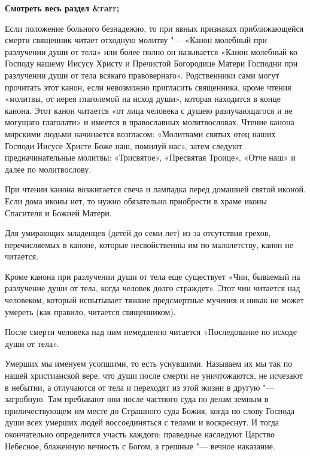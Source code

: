 




\bfseries Смотреть весь раздел &rarr;\normalfont{} 




Если положение больного безнадежно, то при явных признаках приближающейся смерти священник читает отходную молитву "--- «Канон молебный при разлучении души от тела» или более полно он называется «Канон молебный ко Господу нашему Иисусу Христу и Пречистой Богородице Матери Господни при разлучении души от тела всякаго правовернаго». Родственники сами могут прочитать этот канон, если невозможно пригласить священника, кроме чтения «молитвы, от иерея глаголемой на исход души», которая находится в конце канона. Этот канон читается «от лица человека с душею разлучающагося и не могущаго глаголати» и имеется в православных молитвословах. Чтение канона мирскими людьми начинается возгласом: «Молитвами святых отец наших Господи Иисусе Христе Боже наш, помилуй нас», затем следуют предначинательные молитвы: «Трисвятое», «Пресвятая Троице», «Отче наш» и далее по молитвослову.


При чтении канона возжигается свеча и лампадка перед домашней святой иконой. Если дома иконы нет, то нужно обязательно приобрести в храме иконы Спасителя и Божией Матери.


Для умирающих младенцев (детей до семи лет) из-за отсутствия грехов, перечисляемых в каноне, которые несвойственны им по малолетству, канон не читается. 


Кроме канона при разлучении души от тела еще существует «Чин, бываемый на разлучение души от тела, когда человек долго страждет». Этот чин читается над человеком, который испытывает тяжкие предсмертные мучения и никак не может умереть (как правило, читается священником). 


После смерти человека над ним немедленно читается «Последование по исходе души от тела». 


\mychapterending




Умерших мы именуем усопшими, то есть уснувшими. Называем их мы так по нашей христианской вере, что души после смерти не уничтожаются, не исчезают в небытии, а отлучаются от тела и переходят из этой жизни в другую "--- загробную. Там пребывают они после частного суда по делам земным в приличествующем им месте до Страшного суда Божия, когда по слову Господа души всех умерших людей воссоединяться с телами и воскреснут. И тогда окончательно определится участь каждого: праведные наследуют Царство Небесное, блаженную вечность с Богом, а грешные "--- вечное наказание. 

